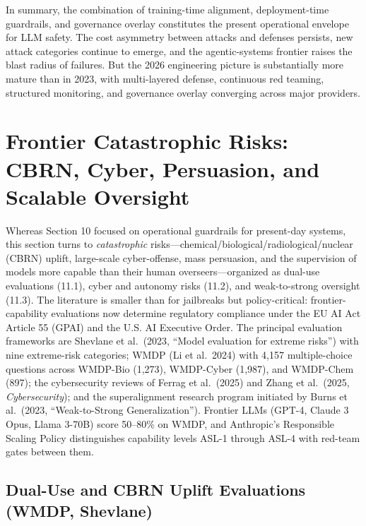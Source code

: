 In summary, the combination of training-time alignment, deployment-time guardrails, and governance overlay constitutes the present operational envelope for LLM safety. The cost asymmetry between attacks and defenses persists, new attack categories continue to emerge, and the agentic-systems frontier raises the blast radius of failures. But the 2026 engineering picture is substantially more mature than in 2023, with multi-layered defense, continuous red teaming, structured monitoring, and governance overlay converging across major providers.

\section{Frontier Catastrophic Risks: CBRN, Cyber, Persuasion, and Scalable Oversight}\label{frontier-catastrophic-risks-cbrn-cyber-persuasion-and-scalable-oversight}

Whereas Section 10 focused on operational guardrails for present-day systems, this section turns to \emph{catastrophic} risks---chemical/biological/radiological/nuclear (CBRN) uplift, large-scale cyber-offense, mass persuasion, and the supervision of models more capable than their human overseers---organized as dual-use evaluations (11.1), cyber and autonomy risks (11.2), and weak-to-strong oversight (11.3). The literature is smaller than for jailbreaks but policy-critical: frontier-capability evaluations now determine regulatory compliance under the EU AI Act Article 55 (GPAI) and the U.S. AI Executive Order. The principal evaluation frameworks are Shevlane et al.~(2023, ``Model evaluation for extreme risks'') with nine extreme-risk categories; WMDP (Li et al.~2024) with 4,157 multiple-choice questions across WMDP-Bio (1,273), WMDP-Cyber (1,987), and WMDP-Chem (897); the cybersecurity reviews of Ferrag et al.~(2025) and Zhang et al.~(2025, \emph{Cybersecurity}); and the superalignment research program initiated by Burns et al.~(2023, ``Weak-to-Strong Generalization''). Frontier LLMs (GPT-4, Claude 3 Opus, Llama 3-70B) score 50--80\% on WMDP, and Anthropic's Responsible Scaling Policy distinguishes capability levels ASL-1 through ASL-4 with red-team gates between them.

\subsection{Dual-Use and CBRN Uplift Evaluations (WMDP, Shevlane)}\label{dual-use-and-cbrn-uplift-evaluations-wmdp-shevlane}

